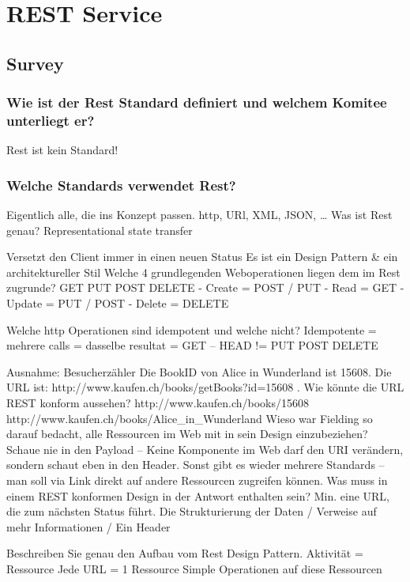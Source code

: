 \chapter{REST Service}

\section{Survey}

\subsection{Wie ist der Rest Standard definiert und welchem Komitee unterliegt er?}

Rest ist kein Standard!


\subsection{Welche Standards verwendet Rest?}

Eigentlich alle, die ins Konzept passen.
http, URl, XML, JSON, …
Was ist Rest genau?
Representational state transfer

Versetzt den Client immer in einen neuen Status
Es ist ein Design Pattern & ein architektureller Stil
Welche 4 grundlegenden Weboperationen liegen dem im Rest zugrunde?
GET PUT POST DELETE
-	Create = POST / PUT
-	Read = GET
-	Update = PUT / POST
-	Delete = DELETE

Welche http Operationen sind idempotent und welche nicht?
Idempotente = mehrere calls = dasselbe resultat
= GET – HEAD 
!= PUT POST DELETE

Ausnahme: Besucherzähler
Die BookID von Alice in Wunderland ist 15608. Die URL ist: http://www.kaufen.ch/books/getBooks?id=15608 . Wie könnte die URL REST konform aussehen?
http://www.kaufen.ch/books/15608
http://www.kaufen.ch/books/Alice_in_Wunderland
Wieso war Fielding so darauf bedacht, alle Ressourcen im Web mit in sein Design einzubeziehen?
Schaue nie in den Payload – Keine Komponente im Web darf den URI verändern, sondern schaut eben in den Header.
Sonst gibt es wieder mehrere Standards – man soll via Link direkt auf andere Ressourcen zugreifen können.
Was muss in einem REST konformen Design in der Antwort enthalten sein?
Min. eine URL, die zum nächsten Status führt.
Die Strukturierung der Daten / Verweise auf mehr Informationen / Ein Header

Beschreiben Sie genau den Aufbau vom Rest Design Pattern.
Aktivität = Ressource
Jede URL = 1 Ressource
Simple Operationen auf diese Ressourcen

